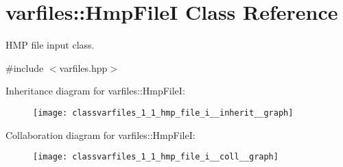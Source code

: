 \hypertarget{classvarfiles_1_1_hmp_file_i}{}\section{varfiles\+:\+:Hmp\+FileI Class Reference}
\label{classvarfiles_1_1_hmp_file_i}


H\+MP file input class.  




{\ttfamily \#include $<$varfiles.\+hpp$>$}



Inheritance diagram for varfiles\+:\+:Hmp\+FileI\+:\nopagebreak
\begin{figure}[H]
\begin{center}
\leavevmode
\texttt{[image: classvarfiles\_1\_1\_hmp\_file\_i\_\_inherit\_\_graph]}
\end{center}
\end{figure}


Collaboration diagram for varfiles\+:\+:Hmp\+FileI\+:\nopagebreak
\begin{figure}[H]
\begin{center}
\leavevmode
\texttt{[image: classvarfiles\_1\_1\_hmp\_file\_i\_\_coll\_\_graph]}
\end{center}
\end{figure}
